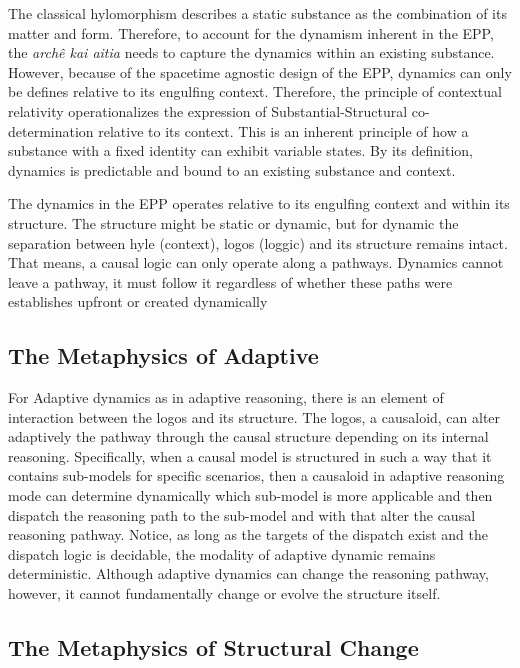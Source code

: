 The classical hylomorphism describes a static substance as the combination of its matter and form. Therefore, to account for the dynamism inherent in the EPP, the \textit{archê kai aitia} needs to capture the dynamics within an existing substance. However, because of the spacetime agnostic design of the EPP, dynamics can only be defines relative to its engulfing context. Therefore, the principle of contextual relativity operationalizes the expression of Substantial-Structural co-determination relative to its context. This is an inherent  principle of how a substance with a fixed identity can exhibit variable states. By its definition, dynamics is predictable and bound to an existing substance and context. 

The dynamics in the EPP operates relative to its engulfing context and within its structure. The structure might be static or dynamic, but for dynamic the separation between hyle (context), logos (loggic) and its structure remains intact. That means, a causal logic can only operate along a pathways. Dynamics cannot leave a pathway, it must follow it regardless of whether these paths were establishes upfront or created dynamically

\subsection{The Metaphysics of Adaptive} 
\label{sec:metaphysics_adaption}

 For Adaptive dynamics as in adaptive reasoning, there is an element of interaction between the logos and its structure. The logos, a causaloid, can alter adaptively the pathway through the causal structure depending on its internal reasoning. Specifically, when a causal model is structured in such a way that it contains sub-models for specific scenarios, then a causaloid in adaptive reasoning mode can determine dynamically which sub-model is more applicable and then dispatch the reasoning path to the sub-model and with that alter the causal reasoning pathway. Notice, as long as the targets of the dispatch exist and the dispatch logic is decidable, the modality of adaptive dynamic remains deterministic. Although adaptive dynamics can change the reasoning pathway, however, it cannot fundamentally change or evolve the structure itself.  


\subsection{The Metaphysics of Structural Change} 
\label{sec:metaphysics_becoming}

